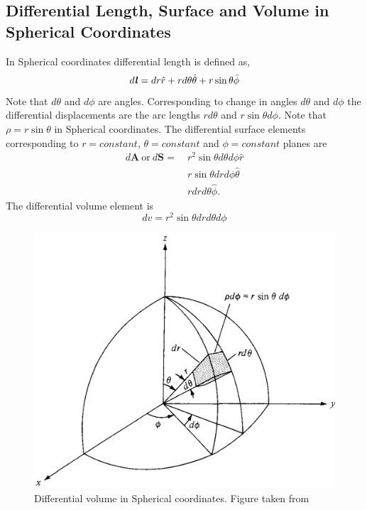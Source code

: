 \documentclass[12pt,a4paper]{article}
\begin{document}
\subsection{Differential Length, Surface and Volume in Spherical Coordinates}
In Spherical coordinates differential length is defined as,
\begin{equation}
d\textbf{\textit{l}}=dr\hat r+r d\theta\hat \theta+r\sin\theta\hat \phi
\end{equation}
Note that $d\theta$ and $d\phi$ are angles. Corresponding to change in angles $d\theta$ and $d\phi$ the differential displacements are the arc lengths $rd\theta$ and $r\sin\theta d\phi$. Note that $\rho=r\sin\theta$ in Spherical coordinates. The differential surface elements corresponding to $r=constant$, $\theta=constant$ and $\phi=constant$ planes are
\begin{equation}
\begin{split}
d\textbf{A}~\mathrm{or}~d\textbf{S}=~&r^2\sin\theta d\theta d\phi\hat r\\
&r\sin\theta dr d\phi\hat\theta\\
&r dr d\theta\hat\phi.
\end{split}
\end{equation}
The differential volume element is
\begin{equation}
dv=r^2\sin\theta dr d\theta d\phi
\end{equation}
\begin{figure}[H]
\centering
\includegraphics[scale=0.3]{Figure3-5S.png}
\caption{Differential volume in Spherical coordinates. Figure taken from~\cite[Figure 3.5, page 57]{Sadiku}}
\label{Spherical-differential-volume}
\end{figure}
\end{document}

